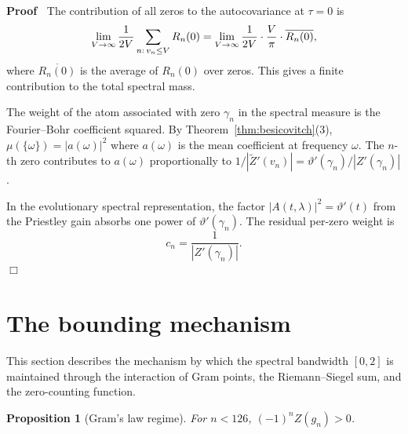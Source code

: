 \documentclass{article}
\newenvironment{proof}{\noindent\textbf{Proof\ }}{\hspace*{\fill}$\Box$\medskip}
\newtheorem{proposition}{Proposition}
{\theorembodyfont{\rmfamily}\newtheorem{remark}{Remark}}
\begin{document}
\begin{proof}
  The contribution of all zeros to the autocovariance at $\tau = 0$ is
  \[ \lim_{V \to \infty}  \frac{1}{2 V}  \sum_{n : \hspace{0.17em} v_n \le V}
     R_n (0) = \lim_{V \to \infty}  \frac{1}{2 V} \cdot \frac{V}{\pi} \cdot
     \overline{R_n (0)}, \]
  where $\overline{R_n (0)}$ is the average of $R_n (0)$ over zeros. This
  gives a finite contribution to the total spectral mass.
  
  The weight of the atom associated with zero $\gamma_n$ in the spectral
  measure is the Fourier--Bohr coefficient squared. By
  Theorem~\ref{thm:besicovitch}(3), $\mu (\{\omega\}) = |a (\omega) |^2$ where
  $a (\omega)$ is the mean coefficient at frequency $\omega$. The $n$-th zero
  contributes to $a (\omega)$ proportionally to $1 / | \tilde{Z}' (v_n) | =
  \vartheta' (\gamma_n) / |Z' (\gamma_n) |$.
  
  In the evolutionary spectral representation, the factor $|A (t, \lambda) |^2
  = \vartheta' (t)$ from the Priestley gain absorbs one power of $\vartheta'
  (\gamma_n)$. The residual per-zero weight is
  \begin{equation}
    \label{eq:cn-computation} c_n = \frac{1}{|Z' (\gamma_n) |} .
  \end{equation}
\end{proof}

\section{The bounding mechanism}\label{sec:bounding}

This section describes the mechanism by which the spectral bandwidth $[0, 2]$
is maintained through the interaction of Gram points, the Riemann--Siegel sum,
and the zero-counting function.

\begin{proposition}
  [Gram's law regime]\label{prop:gram-law} For $n < 126$, $(- 1)^n Z (g_n) >
  0$.
\end{proposition}
\end{document}
